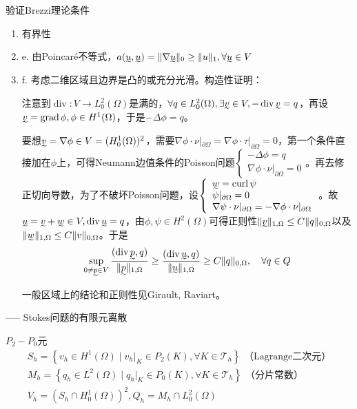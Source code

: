 验证Brezzi理论条件
\begin{enumerate}
  \item 有界性
  \item e. 由Poincaré不等式，$a(\undertilde{u}, \undertilde{u}) = \|\nabla \undertilde{u}\|_0 \ge \|u\|_1, \forall \undertilde{u} \in V$
  \item f. 考虑二维区域且边界是凸的或充分光滑。构造性证明：
  
  注意到$\operatorname{div}: V \to L_0^2(\Omega)$是满的，$\forall q \in L_0^2(\Omega), \exists \undertilde{v} \in V, -\operatorname{div} \undertilde{v} = q$，再设$\undertilde{v} = \operatorname{grad}\phi, \phi \in H^1(\Omega)$，于是$-\Delta \phi = q$。

  要想$\undertilde{v} = \nabla \phi \in V = (H_0^1(\Omega))^2$，需要$\nabla \phi \cdot \nu|_{\partial \Omega} = \nabla \phi \cdot \tau|_{\partial \Omega} = 0$，第一个条件直接加在$\phi$上，可得Neumann边值条件的Poisson问题$\left\{\begin{array}{l}
    -\Delta \phi=q \\
    \nabla \phi \cdot \nu|_{\partial \Omega}=0
  \end{array}\right.$。再去修正切向导数，为了不破坏Poisson问题，设$\left\{\begin{array}{l}
    \undertilde{w} = \operatorname{curl} \psi\\
    \psi|_{\partial \Omega} = 0\\
    \nabla \psi \cdot \nu|_{\partial \Omega} = - \nabla \phi \cdot \nu|_{\partial \Omega}
  \end{array}\right.$。故$\undertilde{u} = \undertilde{v} + \undertilde{w} \in V, \operatorname{div}\undertilde{u} = q$，由$\phi, \psi \in H^2(\Omega)$可得正则性$\|\undertilde{v}\|_{1, \Omega} \le C\|q\|_{0, \Omega}$以及$\|\undertilde{w}\|_{1, \Omega} \le C\|v\|_{0, \Omega}$。于是
  \[
    \sup_{0 \neq \undertilde{p} \in V} \frac{(\operatorname{div} \undertilde{p}, q)}{\|\undertilde{p}\|_{1, \Omega}} \ge \frac{(\operatorname{div} \undertilde{u}, q)}{\|\undertilde{u}\|_{1, \Omega}} \ge C\|q\|_{0, \Omega}, \quad \forall q \in Q
  \]
  



  
  一般区域上的结论和正则性见Girault, Raviart。
\end{enumerate}

----- Stokes问题的有限元离散

$P_2 - P_0$元
\[
  \begin{array}{l}
    S_{h}=\left\{v_{h} \in H^{1}(\Omega) \mid v_{h}|_{K} \in P_{2}(K), \forall K \in \mathcal{T}_{h}\right\} \text{ （Lagrange二次元）}\\
    M_{h}=\left\{q_{h} \in L^{2}(\Omega) \mid q_{h}|_{K} \in P_{0}(K), \forall K \in \mathcal{T}_{h}\right\} \text{ （分片常数）}\\
    V_{h}=\left(S_{h} \cap H_{0}^{1}(\Omega)\right)^{2}, Q_{h}=M_{h} \cap L_{0}^{2}(\Omega)
  \end{array} 
\]

